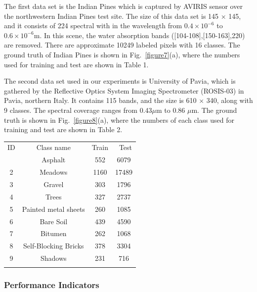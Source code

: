 \documentclass{ws-ijwmip}
\begin{document}
\begin{itemlist}
 \item The first data set is the Indian Pines which is captured by AVIRIS sensor over the northwestern Indian Pines test site. The size of this data set is 145 $\times$ 145, and it consists of 224 spectral with in the wavelength from $0.4 \times 10^{-6}$ to $0.6 \times 10^{-6}$m. In this scene, the water absorption bands ([104-108],[150-163],220) are removed. There are approximate 10249 labeled pixels with 16 classes. The ground truth of Indian Pines is shown in Fig.~\ref{figure7}(a), where the numbers used for training and test are shown in Table 1.
 
 \item The second data set used in our experiments is University of Pavia, which is gathered by the Reflective Optics System Imaging Spectrometer (ROSIS-03) in Pavia, northern Italy. It contains 115 bands, and the size is 610 $\times$ 340, along with 9 classes. The  spectral coverage ranges from 0.43$\mu$m to 0.86 $\mu$m. The ground truth is shown in Fig.~\ref{figure8}(a), where the numbers of each class used for training and test are shown in Table 2.

\end{itemlist}
\begin{table}[ht]
{\begin{tabular}{@{}cccc@{}} \toprule
ID & Class name & Train &\ Test \\
  \colrule
 1 & Asphalt & 552 & 6079 \\
             2 & Meadows	& 1160 & 17489 \\
             3 & Gravel	& 303 & 1796 \\
             4 & Trees & 327 & 2737 \\
             5 & Painted metal sheets	 & 260 & 1085 \\
             6 & Bare Soil	 & 439 & 4590 \\
             7 & Bitumen	 & 262 & 1068 \\
             8 & Self-Blocking Bricks	 & 378 & 3304 \\
             9 & Shadows & 231 & 716  \\ \botrule
\end{tabular}}
\label{table2}
\end{table}

\subsubsection{Performance Indicators}
\end{document}

